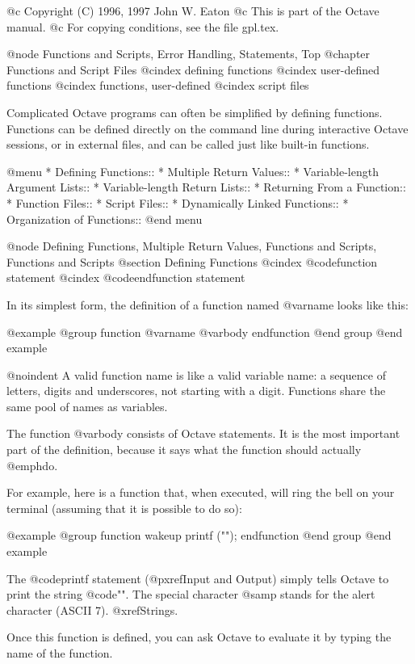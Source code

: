 @c Copyright (C) 1996, 1997 John W. Eaton
@c This is part of the Octave manual.
@c For copying conditions, see the file gpl.tex.

@node Functions and Scripts, Error Handling, Statements, Top
@chapter Functions and Script Files
@cindex defining functions
@cindex user-defined functions
@cindex functions, user-defined
@cindex script files

Complicated Octave programs can often be simplified by defining
functions.  Functions can be defined directly on the command line during
interactive Octave sessions, or in external files, and can be called just
like built-in functions.

@menu
* Defining Functions::          
* Multiple Return Values::      
* Variable-length Argument Lists::  
* Variable-length Return Lists::  
* Returning From a Function::   
* Function Files::              
* Script Files::                
* Dynamically Linked Functions::  
* Organization of Functions::   
@end menu

@node Defining Functions, Multiple Return Values, Functions and Scripts, Functions and Scripts
@section Defining Functions
@cindex @code{function} statement
@cindex @code{endfunction} statement

In its simplest form, the definition of a function named @var{name}
looks like this:

@example
@group
function @var{name}
  @var{body}
endfunction
@end group
@end example

@noindent
A valid function name is like a valid variable name: a sequence of
letters, digits and underscores, not starting with a digit.  Functions
share the same pool of names as variables.

The function @var{body} consists of Octave statements.  It is the
most important part of the definition, because it says what the function
should actually @emph{do}.

For example, here is a function that, when executed, will ring the bell
on your terminal (assuming that it is possible to do so):

@example
@group
function wakeup
  printf ("\a");
endfunction
@end group
@end example

The @code{printf} statement (@pxref{Input and Output}) simply tells
Octave to print the string @code{"\a"}.  The special character @samp{\a}
stands for the alert character (ASCII 7).  @xref{Strings}.

Once this function is defined, you can ask Octave to evaluate it by
typing the name of the function.

